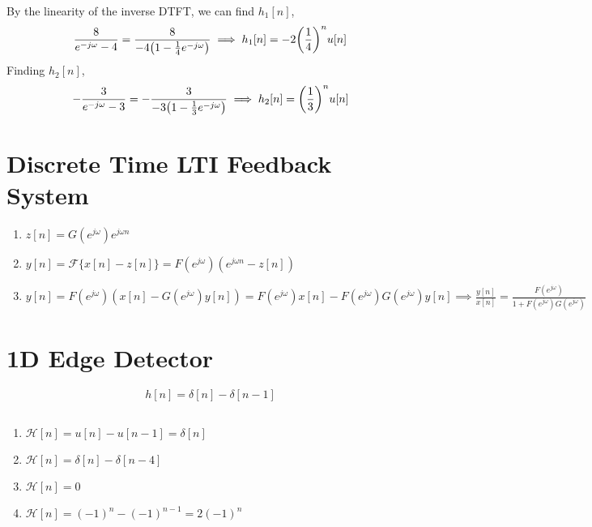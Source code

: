 \documentclass{article}
\renewcommand{\labelenumi}{\arabic{enumi}.}
\begin{document}
By the linearity of the inverse DTFT, we can find \(h_1[n]\),
\begin{equation}
    \frac{8}{e^{-j \omega} - 4} = \frac{8}{-4 \qty(1 - \frac{1}{4} e^{-j \omega})} \implies h_1[n] = -2 \qty(\frac{1}{4})^n u[n]
\end{equation}
Finding \(h_2[n]\),
\begin{equation}
    -\frac{3}{e^{-j \omega} - 3} = -\frac{3}{-3 \qty(1 - \frac{1}{3} e^{-j \omega})} \implies h_2[n] = \qty(\frac{1}{3})^n u[n]
\end{equation}

\section{Discrete Time LTI Feedback System}

\begin{enumerate}
    \item \(z[n] = G(e^{j \omega}) e^{j \omega n}\)
    \item \(y[n] = \mathcal{F}\{x[n] - z[n]\} = F(e^{j \omega}) (e^{j \omega n} - z[n])\)
    \item \(y[n] = F(e^{j \omega}) (x[n] - G(e^{j \omega}) y[n]) = F(e^{j \omega}) x[n] - F(e^{j \omega}) G(e^{j \omega}) y[n] \implies \frac{y[n]}{x[n]} = \frac{F(e^{j \omega})}{1 + F(e^{j \omega}) G(e^{j \omega})}\)
\end{enumerate}

\subsection{}

\section{1D Edge Detector}

\begin{equation}
    h[n] = \delta[n] - \delta[n - 1]
\end{equation}

\subsection{}

\renewcommand{\labelenumi}{\alph{enumi}.}
\begin{enumerate}
    \item \(\mathcal{H}[n] = u[n] - u[n - 1] = \delta[n]\)
    \item \(\mathcal{H}[n] = \delta[n] - \delta[n - 4]\)
    \item \(\mathcal{H}[n] = 0\)
    \item \(\mathcal{H}[n] = (-1)^n - (-1)^{n - 1} = 2(-1)^n\)
\end{enumerate}
\end{document}
